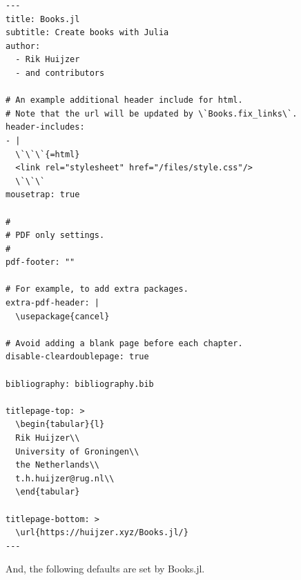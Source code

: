 \documentclass[
  notoc %
]{tufte-book}
\begin{document}
\begin{lstlisting}[language=Output]
---
title: Books.jl
subtitle: Create books with Julia
author:
  - Rik Huijzer
  - and contributors

# An example additional header include for html.
# Note that the url will be updated by \`Books.fix_links\`.
header-includes:
- |
  \`\`\`{=html}
  <link rel="stylesheet" href="/files/style.css"/>
  \`\`\`
mousetrap: true

#
# PDF only settings.
#
pdf-footer: ""

# For example, to add extra packages.
extra-pdf-header: |
  \usepackage{cancel}

# Avoid adding a blank page before each chapter.
disable-cleardoublepage: true

bibliography: bibliography.bib

titlepage-top: >
  \begin{tabular}{l}
  Rik Huijzer\\
  University of Groningen\\
  the Netherlands\\
  t.h.huijzer@rug.nl\\
  \end{tabular}

titlepage-bottom: >
  \url{https://huijzer.xyz/Books.jl/}
---

\end{lstlisting}

And, the following defaults are set by Books.jl.
\end{document}
